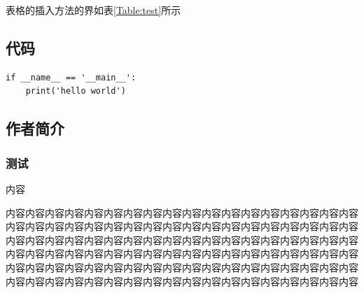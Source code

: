 \documentclass{bjfu}
\begin{document}
表格的插入方法的界如表\ref{Table:test}所示
\begin{table}[h]  %
    \renewcommand\arraystretch{1.5}
    \centering  %
    \label{Table:test} %
\end{table}

\subsection{代码}

\begin{verbatim}
if __name__ == '__main__':
    print('hello world')
\end{verbatim}

\subsection{作者简介}
\subsubsection{测试}
内容


\bjfuack
内容内容内容内容内容内容内容内容内容内容内容内容内容内容内容内容内容内容内容内容内容内容内容内容内容内容内容内容内容内容内容内容内容内容内容内容内容内容内容内容内容内容内容内容内容内容内容内容内容内容内容内容内容内容内容内容内容内容内容内容内容内容内容内容内容内容内容内容内容内容内容内容内容内容内容内容内容内容内容内容内容内容内容内容内容内容内容内容内容内容内容内容内容内容内容内容内容内容内容内容内容内容内容内容内容内容内容内容



\end{document}
